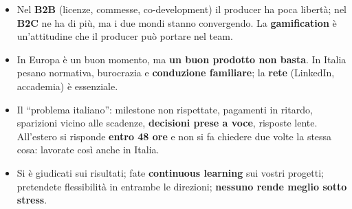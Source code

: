 \begin{itemize}
  \item Nel \textbf{B2B} (licenze, commesse, co-development) il producer ha poca
        libertà; nel \textbf{B2C} ne ha di più, ma i due mondi stanno
        convergendo. La \textbf{gamification} è un'attitudine che il producer può
        portare nel team.
  \item In Europa è un buon momento, ma \textbf{un buon prodotto non basta}. In
        Italia pesano normativa, burocrazia e \textbf{conduzione familiare}; la
        \textbf{rete} (LinkedIn, accademia) è essenziale.
  \item Il ``problema italiano'': milestone non rispettate, pagamenti in ritardo,
        sparizioni vicino alle scadenze, \textbf{decisioni prese a voce},
        risposte lente. All'estero si risponde \textbf{entro 48 ore} e non si fa
        chiedere due volte la stessa cosa: lavorate così anche in Italia.
  \item Si è giudicati sui risultati; fate \textbf{continuous learning} sui
        vostri progetti; pretendete flessibilità in entrambe le direzioni;
        \textbf{nessuno rende meglio sotto stress}.
\end{itemize}
